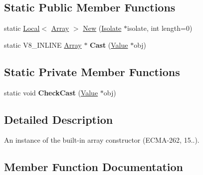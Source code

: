 \subsection*{Static Public Member Functions}
\begin{DoxyCompactItemize}
\item 
static \hyperlink{classv8_1_1_local}{Local}$<$ \hyperlink{classv8_1_1_array}{Array} $>$ \hyperlink{classv8_1_1_array_a892f18fe6a25dfc0bc7b435759a30226}{New} (\hyperlink{classv8_1_1_isolate}{Isolate} $\ast$isolate, int length=0)
\item 
static V8\+\_\+\+I\+N\+L\+I\+NE \hyperlink{classv8_1_1_array}{Array} $\ast$ {\bfseries Cast} (\hyperlink{classv8_1_1_value}{Value} $\ast$obj)\hypertarget{classv8_1_1_array_ae56792766f8513395c3ebe8c29afde4b}{}\label{classv8_1_1_array_ae56792766f8513395c3ebe8c29afde4b}

\end{DoxyCompactItemize}
\subsection*{Static Private Member Functions}
\begin{DoxyCompactItemize}
\item 
static void {\bfseries Check\+Cast} (\hyperlink{classv8_1_1_value}{Value} $\ast$obj)\hypertarget{classv8_1_1_array_af0b37e9453a594b16c7f6ad2c07b11ac}{}\label{classv8_1_1_array_af0b37e9453a594b16c7f6ad2c07b11ac}

\end{DoxyCompactItemize}


\subsection{Detailed Description}
An instance of the built-\/in array constructor (E\+C\+M\+A-\/262, 15..). 

\subsection{Member Function Documentation}
